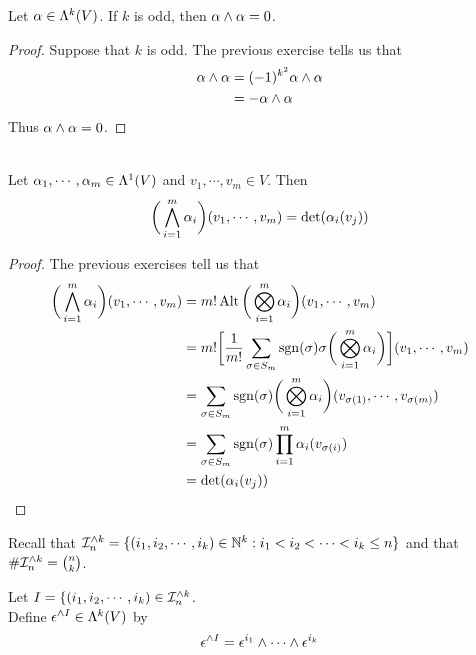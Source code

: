 \documentclass{book}
\begin{document}
	\begin{ex}
		Let $\alpha \in \Lambda^k(V)$. If $k$ is odd, then $\alpha \wedge \alpha = 0$. 
	\end{ex}

	\begin{proof}
		Suppose that $k$ is odd. The previous exercise tells us that 
		\begin{align*}
			\alpha \wedge \alpha 
			& = (-1)^{k^2} \alpha \wedge \alpha \\
			& = -\alpha \wedge \alpha
		\end{align*}
		Thus $\alpha \wedge \alpha = 0$.
	\end{proof}
	
	\begin{ex}\\
		Let $\alpha_1, \cdots, \alpha_m \in \Lambda^1(V)$ and $v_1, \cdots, v_m \in V$. Then $$\bigg( \bigwedge_{i=1}^m \alpha_i \bigg)(v_1, \cdots, v_m) = \det (\alpha_i (v_j))$$
	\end{ex}

	\begin{proof}
		The previous exercises tell us that
		\begin{align*}
			\bigg( \bigwedge_{i=1}^m \alpha_i \bigg)(v_1, \cdots, v_m)
			& = m! \operatorname{Alt} \bigg( \bigotimes_{i=1}^m \alpha_i \bigg) (v_1, \cdots, v_m) \\
			& = m! \bigg[ \frac{1}{m!} \sum_{\sigma \in S_{m}} \operatorname{sgn}(\sigma) \sigma \bigg(\bigotimes_{i=1}^m \alpha_i \bigg) \bigg] (v_1, \cdots, v_m) \\
			& = \sum_{\sigma \in S_{m}} \operatorname{sgn}(\sigma)  \bigg(\bigotimes_{i=1}^m \alpha_i \bigg) (v_{\sigma(1)}, \cdots, v_{\sigma(m)}) \\
			& = \sum_{\sigma \in S_{m}} \operatorname{sgn}(\sigma)  \prod_{i=1}^m \alpha_i(v_{\sigma(i)})   \\
			& = \det (\alpha_i (v_j))
		\end{align*}
	\end{proof}

	\begin{note}
		Recall that $\mathcal{I}_n^{\wedge k} = \{(i_1, i_2, \cdots, i_k) \in \mathbb{N}^k: i_1 < i_2 < \cdots < i_k \leq n \}$ and that $\# \mathcal{I}_n^{\wedge k} = {n \choose k}$. 
	\end{note}

	\begin{defn}
		Let $I = \{(i_1, i_2, \cdots, i_k) \in \mathcal{I}_n^{\wedge k}$. \\ Define $\epsilon^{\wedge I} \in \Lambda^k(V)$ by $$ \epsilon^{\wedge I} = \epsilon^{i_1} \wedge \cdots \wedge \epsilon^{i_k} $$ 
	\end{defn}
\end{document}
